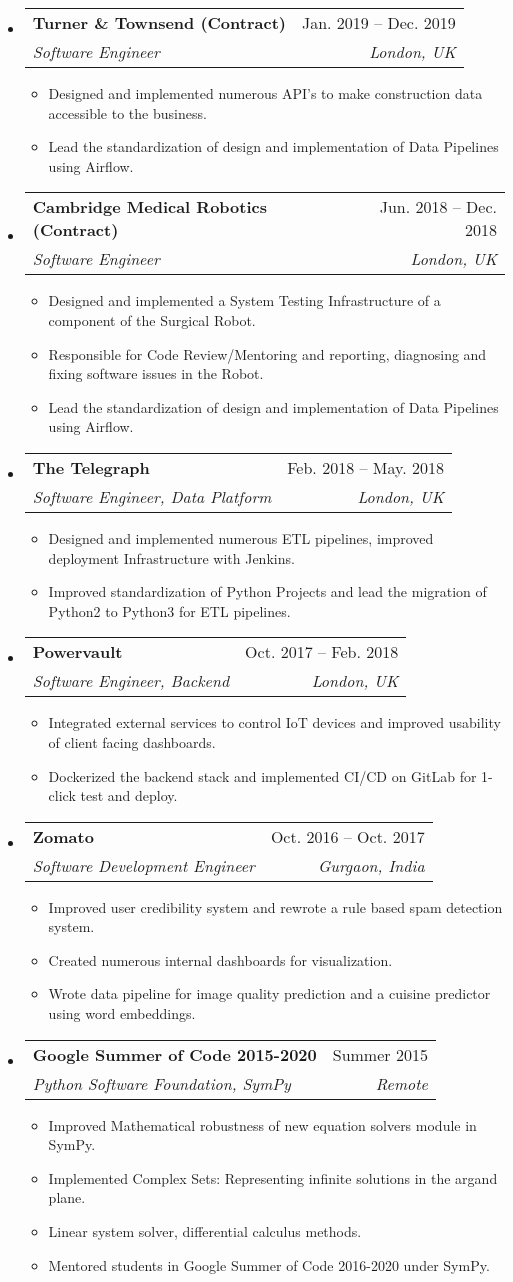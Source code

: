 \documentclass[letterpaper,12pt]{article}[leftmargin=*]
\makeatletter
\def \entryspacing {-0pt}
\newcommand{\resumeEntryStart}{\begin{itemize}[leftmargin=2.5mm]}
\newcommand{\resumeEntryEnd}{\end{itemize}\vspace{\entryspacing}}
\newcommand{\resumeItemListStart}{\begin{itemize}[leftmargin=4.5mm]}
\newcommand{\resumeItemListEnd}{\end{itemize}}
\newcommand{\resumeItem}[1]{
  \item\small{
    {#1 \vspace{-2pt}}
  }
}
\newcommand{\resumeEntryTSDL}[4]{
  \vspace{-1pt}\item[]
    \begin{tabularx}{0.97\textwidth}{X@{\hspace{60pt}}r}
      \textbf{\color{primary}#1} & {\firabook\color{accent}\small#2} \\
      \textit{\color{accent}\small#3} & \textit{\color{accent}\small#4} \\
    \end{tabularx}\vspace{-6pt}
}
\makeatother
\begin{document}
  \resumeEntryStart
    \resumeEntryTSDL
      {Turner \& Townsend (Contract)}{Jan. 2019 -- Dec. 2019}
      {Software Engineer}{London, UK}
    \resumeItemListStart
      \resumeItem {Designed and implemented numerous API's to make construction data accessible to the business.}
      \resumeItem{Lead the standardization of design and implementation of Data Pipelines using Airflow.}
    \resumeItemListEnd
  \resumeEntryEnd

  \resumeEntryStart
    \resumeEntryTSDL
      {Cambridge Medical Robotics (Contract)}{Jun. 2018 -- Dec. 2018}
      {Software Engineer}{London, UK}
    \resumeItemListStart
      \resumeItem {Designed and implemented a System Testing Infrastructure of a component of the Surgical Robot.}
      \resumeItem {Responsible for Code Review/Mentoring and reporting, diagnosing and fixing software issues in the Robot.}
      \resumeItem{Lead the standardization of design and implementation of Data Pipelines using Airflow.}
    \resumeItemListEnd
  \resumeEntryEnd


  \resumeEntryStart
    \resumeEntryTSDL
      {The Telegraph}{Feb. 2018 -- May. 2018}
      {Software Engineer, Data Platform}{London, UK}
    \resumeItemListStart
      \resumeItem {Designed and implemented numerous ETL pipelines, improved deployment Infrastructure with Jenkins.}
      \resumeItem {Improved standardization of Python Projects and lead the migration of Python2 to Python3 for ETL pipelines.}
    \resumeItemListEnd
  \resumeEntryEnd

  \resumeEntryStart
    \resumeEntryTSDL
      {Powervault}{Oct. 2017 -- Feb. 2018}
      {Software Engineer, Backend}{London, UK}
    \resumeItemListStart
      \resumeItem {Integrated external services to control IoT devices and improved usability of client facing dashboards.}
      \resumeItem{Dockerized the backend stack and implemented CI/CD on GitLab for 1-click test and deploy.}
    \resumeItemListEnd
  \resumeEntryEnd

  \resumeEntryStart
    \resumeEntryTSDL
      {Zomato}{Oct. 2016 -- Oct. 2017}
      {Software Development Engineer}{Gurgaon, India}
    \resumeItemListStart
      \resumeItem {Improved user credibility system and rewrote a rule based spam detection system.}
      \resumeItem{Created numerous internal dashboards for visualization.}
      \resumeItem{Wrote data pipeline for image quality prediction and a cuisine predictor using word embeddings.}
    \resumeItemListEnd
  \resumeEntryEnd

  \resumeEntryStart
    \resumeEntryTSDL
      {Google Summer of Code 2015-2020}{Summer 2015}
      {Python Software Foundation, SymPy}{Remote}
    \resumeItemListStart
      \resumeItem {Improved Mathematical robustness of new equation solvers module in SymPy.}
      \resumeItem{Implemented Complex Sets: Representing infinite solutions in the argand plane.}
      \resumeItem{Linear system solver, differential calculus methods.}
      \resumeItem{Mentored students in Google Summer of Code 2016-2020 under SymPy.}
    \resumeItemListEnd
  \resumeEntryEnd
\end{document}
